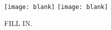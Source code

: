 \begin{figure}
  \begin{center}
    \texttt{[image: blank]}
    \texttt{[image: blank]}
    \caption{\small
      FILL IN.
    }
    \label{fig:phik:opt}
  \end{center}
\end{figure}











